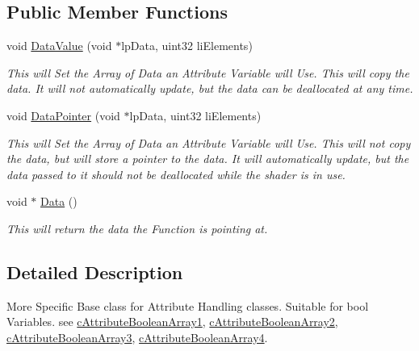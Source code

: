 \subsection*{Public Member Functions}
\begin{DoxyCompactItemize}
\item 
\hypertarget{classc_boolean_attribute_store_af1ea16395c02827582c8aac43a713fa1}{
void \hyperlink{classc_boolean_attribute_store_af1ea16395c02827582c8aac43a713fa1}{DataValue} (void $\ast$lpData, uint32 liElements)}
\label{classc_boolean_attribute_store_af1ea16395c02827582c8aac43a713fa1}

\begin{DoxyCompactList}\small\item\em This will Set the Array of Data an Attribute Variable will Use. This will copy the data. It will not automatically update, but the data can be deallocated at any time. \end{DoxyCompactList}\item 
\hypertarget{classc_boolean_attribute_store_a17ae26d7f4a3d7edfeb9748d20296e13}{
void \hyperlink{classc_boolean_attribute_store_a17ae26d7f4a3d7edfeb9748d20296e13}{DataPointer} (void $\ast$lpData, uint32 liElements)}
\label{classc_boolean_attribute_store_a17ae26d7f4a3d7edfeb9748d20296e13}

\begin{DoxyCompactList}\small\item\em This will Set the Array of Data an Attribute Variable will Use. This will not copy the data, but will store a pointer to the data. It will automatically update, but the data passed to it should not be deallocated while the shader is in use. \end{DoxyCompactList}\item 
\hypertarget{classc_boolean_attribute_store_a5acc1279e3327f694a39f486b33f41c8}{
void $\ast$ \hyperlink{classc_boolean_attribute_store_a5acc1279e3327f694a39f486b33f41c8}{Data} ()}
\label{classc_boolean_attribute_store_a5acc1279e3327f694a39f486b33f41c8}

\begin{DoxyCompactList}\small\item\em This will return the data the Function is pointing at. \end{DoxyCompactList}\end{DoxyCompactItemize}


\subsection{Detailed Description}
More Specific Base class for Attribute Handling classes. Suitable for bool Variables. see \hyperlink{classc_attribute_boolean_array1}{cAttributeBooleanArray1}, \hyperlink{classc_attribute_boolean_array2}{cAttributeBooleanArray2}, \hyperlink{classc_attribute_boolean_array3}{cAttributeBooleanArray3}, \hyperlink{classc_attribute_boolean_array4}{cAttributeBooleanArray4}. 